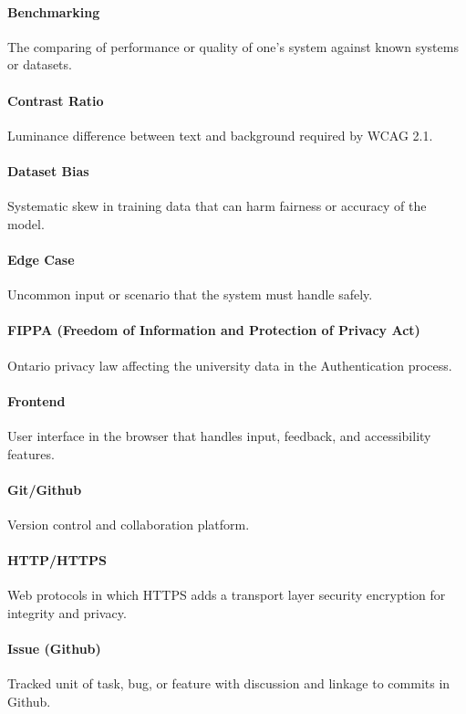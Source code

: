 \documentclass[12pt]{article}
\begin{document}
\paragraph*{Benchmarking}
The comparing of performance or quality of one's system against known systems or datasets.

\paragraph*{Contrast Ratio}
Luminance difference between text and background required by WCAG 2.1.

\paragraph*{Dataset Bias}
Systematic skew in training data that can harm fairness or accuracy of the model.

\paragraph*{Edge Case}
Uncommon input or scenario that the system must handle safely.

\paragraph*{FIPPA (Freedom of Information and Protection of Privacy Act)}
Ontario privacy law affecting the university data in the Authentication process.

\paragraph*{Frontend}
User interface in the browser that handles input, feedback, and accessibility features.

\paragraph*{Git/Github}
Version control and collaboration platform. 

\paragraph*{HTTP/HTTPS}
Web protocols in which HTTPS adds a transport layer security encryption for integrity and privacy.

\paragraph*{Issue (Github)}
Tracked unit of task, bug, or feature with discussion and linkage to commits in Github.
\end{document}

